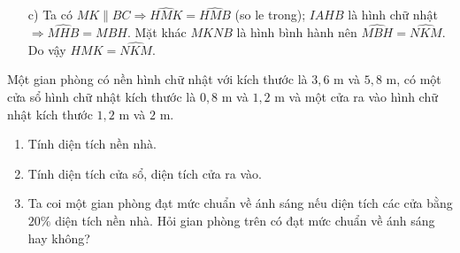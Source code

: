 \begin{bt}
{{
}	
	\begin{enumerate}
	\item [c)]  Ta có $MK \parallel BC\Rightarrow \widehat{HMK} = \widehat{HMB}$ (so le trong);
	$IAHB$ là hình chữ nhật $\Rightarrow \widehat{MHB} = \widehat{MBH}$. Mặt khác $MKNB$ là hình bình hành nên $\widehat{MBH} = \widehat{NKM}$. Do vậy $\widehat{HMK} = \widehat{NKM}$.
	
	\end{enumerate}	
	}
\end{bt}
\begin{bt}%
	Một gian phòng có nền hình chữ nhật với kích thước là $3{,}6$ m và
	$5{,}8$ m, có một cửa sổ hình chữ nhật kích thước là $0{,}8$ m và $1{,}2$ m và một cửa ra vào hình	chữ nhật kích thước $1{,}2$ m và $2$ m.
	\begin{enumerate}
	\item Tính diện tích nền nhà.
	\item Tính diện tích cửa sổ, diện tích cửa ra vào.
	\item Ta coi một gian phòng đạt mức chuẩn về ánh sáng nếu diện tích các cửa bằng $20\%$ diện tích nền nhà. Hỏi gian phòng trên có đạt mức chuẩn về ánh sáng hay không?
	\end{enumerate}
\end{bt}
